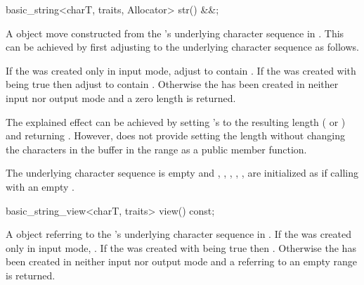 \documentclass[ebook,11pt,article]{memoir}
\begin{document}
\begin{insrt}
\begin{itemdecl}
basic_string<charT, traits, Allocator> str() &&;
\end{itemdecl}
\begin{itemdescr}

\pnum
\returns A  object move constructed from 
the 's underlying character sequence
in . 
This can be achieved by first adjusting  to the underlying character sequence as follows.

If the  was created only in input mode, adjust  to contain
. 
If the  was created with  being true 
then adjust  to contain .
Otherwise the  has been created in neither input nor output mode 
and a zero length  is returned. 

\pnum
\begin{note}
The explained effect can be achieved by setting 's  to the resulting length ( or ) and returning . However,  does not provide setting the length without changing the characters in the buffer in the range \tcode{[buf.data()+buf.size(), buf.data()+buf.capacity())} as a public member function.
\end{note}

\pnum
\ensures The underlying character sequence  is empty and , , , , ,  are initialized as if calling  with an empty .

\end{itemdescr}

\begin{itemdecl}
basic_string_view<charT, traits> view() const;
\end{itemdecl}
\begin{itemdescr}
\pnum
\returns A  object referring to the 's underlying character sequence
in . 
If the  was created only in input mode,  
. 
If the  was created with  being true 
then .
Otherwise the  has been created in neither input nor output mode 
and a  referring to an empty range is returned. 


\end{itemdescr}
\end{insrt}
\end{document}

